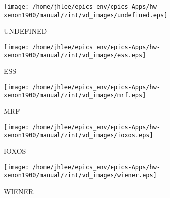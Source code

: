 \noindent
\vspace{1cm}
\begin{minipage}{.2\textwidth}
\begin{center}
\texttt{[image: /home/jhlee/epics\_env/epics-Apps/hw-xenon1900/manual/zint/vd\_images/undefined.eps]}
\end{center}
\end{minipage}
\begin{minipage}{.7\textwidth}
UNDEFINED
\end{minipage}


\noindent
\vspace{1cm}
\begin{minipage}{.2\textwidth}
\begin{center}
\texttt{[image: /home/jhlee/epics\_env/epics-Apps/hw-xenon1900/manual/zint/vd\_images/ess.eps]}
\end{center}
\end{minipage}
\begin{minipage}{.7\textwidth}
ESS
\end{minipage}


\noindent
\vspace{1cm}
\begin{minipage}{.2\textwidth}
\begin{center}
\texttt{[image: /home/jhlee/epics\_env/epics-Apps/hw-xenon1900/manual/zint/vd\_images/mrf.eps]}
\end{center}
\end{minipage}
\begin{minipage}{.7\textwidth}
MRF
\end{minipage}


\noindent
\vspace{1cm}
\begin{minipage}{.2\textwidth}
\begin{center}
\texttt{[image: /home/jhlee/epics\_env/epics-Apps/hw-xenon1900/manual/zint/vd\_images/ioxos.eps]}
\end{center}
\end{minipage}
\begin{minipage}{.7\textwidth}
IOXOS
\end{minipage}


\noindent
\vspace{1cm}
\begin{minipage}{.2\textwidth}
\begin{center}
\texttt{[image: /home/jhlee/epics\_env/epics-Apps/hw-xenon1900/manual/zint/vd\_images/wiener.eps]}
\end{center}
\end{minipage}
\begin{minipage}{.7\textwidth}
WIENER
\end{minipage}


